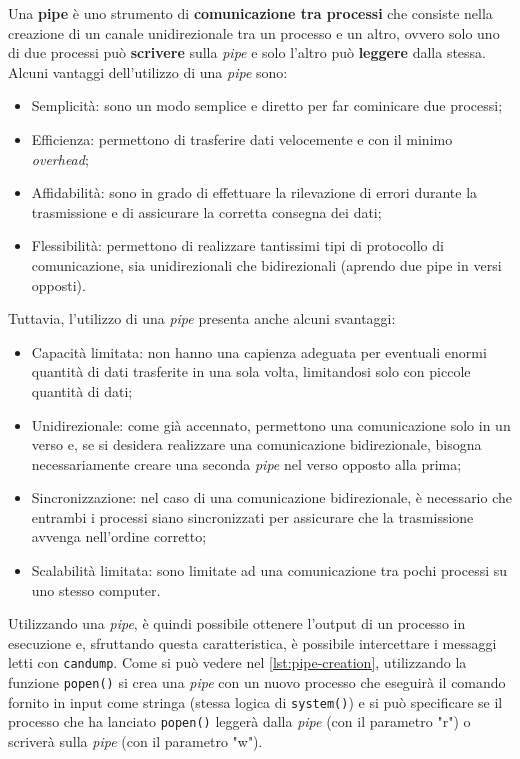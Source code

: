 Una \textbf{pipe} è uno strumento di \textbf{comunicazione tra processi} che consiste nella creazione di un canale unidirezionale tra un processo e un altro, ovvero solo uno di due processi può \textbf{scrivere} sulla \emph{pipe} e solo l'altro può \textbf{leggere} dalla stessa. Alcuni vantaggi dell'utilizzo di una \emph{pipe} sono:
\begin{itemize}
    \item Semplicità: sono un modo semplice e diretto per far cominicare due processi;
    \item Efficienza: permettono di trasferire dati velocemente e con il minimo \emph{overhead};
    \item Affidabilità: sono in grado di effettuare la rilevazione di errori durante la trasmissione e di assicurare la corretta consegna dei dati;
    \item Flessibilità: permettono di realizzare tantissimi tipi di protocollo di comunicazione, sia unidirezionali che bidirezionali (aprendo due pipe in versi opposti). \cite{geeksforgeeks_pipe}
\end{itemize}

Tuttavia, l'utilizzo di una \emph{pipe} presenta anche alcuni svantaggi:
\begin{itemize}
    \item Capacità limitata: non hanno una capienza adeguata per eventuali enormi quantità di dati trasferite in una sola volta, limitandosi solo con piccole quantità di dati;
    \item Unidirezionale: come già accennato, permettono una comunicazione solo in un verso e, se si desidera realizzare una comunicazione bidirezionale, bisogna necessariamente creare una seconda \emph{pipe} nel verso opposto alla prima;
    \item Sincronizzazione: nel caso di una comunicazione bidirezionale, è necessario che entrambi i processi siano sincronizzati per assicurare che la trasmissione avvenga nell'ordine corretto; 
    \item Scalabilità limitata: sono limitate ad una comunicazione tra pochi processi su uno stesso computer. \cite{geeksforgeeks_pipe}
\end{itemize}

Utilizzando una \emph{pipe}, è quindi possibile ottenere l'output di un processo in esecuzione e, sfruttando questa caratteristica, è possibile intercettare i messaggi letti con \texttt{candump}. Come si può vedere nel \autoref{lst:pipe-creation}, utilizzando la funzione \texttt{popen()} si crea una \emph{pipe} con un nuovo processo che eseguirà il comando fornito in input come stringa (stessa logica di \texttt{system()}) e si può specificare se il processo che ha lanciato \texttt{popen()} leggerà dalla \emph{pipe} (con il parametro "r") o scriverà sulla \emph{pipe} (con il parametro "w").

